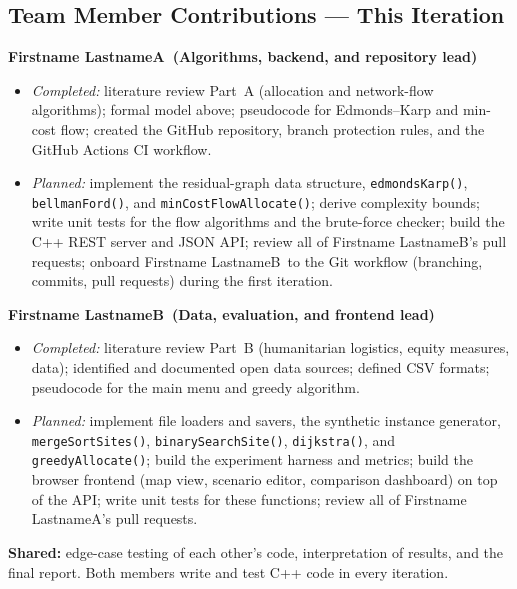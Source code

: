 \documentclass[11pt]{article}
\newcommand{\nameA}{Firstname LastnameA}
\newcommand{\nameB}{Firstname LastnameB}
\begin{document}
\subsection*{Team Member Contributions --- This Iteration}
\textbf{\nameA\ (Algorithms, backend, and repository lead)}
\begin{itemize}
  \item \emph{Completed:} literature review Part~A (allocation and
        network-flow algorithms); formal model above; pseudocode for
        Edmonds--Karp and min-cost flow; created the GitHub repository,
        branch protection rules, and the GitHub Actions CI workflow.
  \item \emph{Planned:} implement the residual-graph data structure,
        \texttt{edmondsKarp()}, \texttt{bellmanFord()}, and
        \texttt{minCostFlowAllocate()}; derive complexity bounds; write unit
        tests for the flow algorithms and the brute-force checker; build the
        C++ REST server and JSON API; review all of \nameB's pull requests;
        onboard \nameB\ to the Git workflow
        (branching, commits, pull requests) during the first iteration.
\end{itemize}
\textbf{\nameB\ (Data, evaluation, and frontend lead)}
\begin{itemize}
  \item \emph{Completed:} literature review Part~B (humanitarian logistics,
        equity measures, data); identified and documented open data sources;
        defined CSV formats; pseudocode for the main menu and greedy
        algorithm.
  \item \emph{Planned:} implement file loaders and savers, the synthetic
        instance generator, \texttt{mergeSortSites()},
        \texttt{binarySearchSite()}, \texttt{dijkstra()}, and
        \texttt{greedyAllocate()}; build the experiment harness and metrics;
        build the browser frontend (map view, scenario editor, comparison
        dashboard) on top of the API; write unit tests for these functions;
        review all of \nameA's pull requests.
\end{itemize}
\textbf{Shared:} edge-case testing of each other's code, interpretation of
results, and the final report. Both members write and test C++ code in every
iteration.
\end{document}
